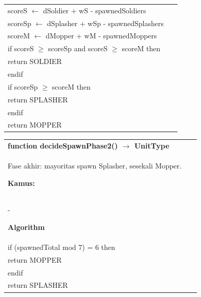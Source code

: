 \documentclass{article}
\newenvironment{pseudobox}
{
\centering
\begin{longtable}{|p{0.94\linewidth}|}
\hline
}
{
\\ \hline
\end{longtable}
\vspace{0.05cm}
}
\begin{document}
\begin{pseudobox}
\hspace*{1em} scoreS $\leftarrow$ dSoldier + wS - spawnedSoldiers \\
\hspace*{1em} scoreSp $\leftarrow$ dSplasher + wSp - spawnedSplashers \\
\hspace*{1em} scoreM $\leftarrow$ dMopper + wM - spawnedMoppers \\

\hspace*{1em} if scoreS $\geq$ scoreSp and scoreS $\geq$ scoreM then \\
\hspace*{2em} return SOLDIER \\
\hspace*{1em} endif \\

\hspace*{1em} if scoreSp $\geq$ scoreM then \\
\hspace*{2em} return SPLASHER \\
\hspace*{1em} endif \\

\hspace*{1em} return MOPPER
\end{pseudobox}

\begin{pseudobox}
\textbf{function decideSpawnPhase2() $\rightarrow$ UnitType} \\
{ Fase akhir: mayoritas spawn Splasher, sesekali Mopper. }

\textbf{Kamus:} \\
\hspace*{1em} -

\textbf{Algorithm} \\
\hspace*{1em} if (spawnedTotal mod 7) = 6 then \\
\hspace*{2em} return MOPPER \\
\hspace*{1em} endif \\

\hspace*{1em} return SPLASHER
\end{pseudobox}
\end{document}
